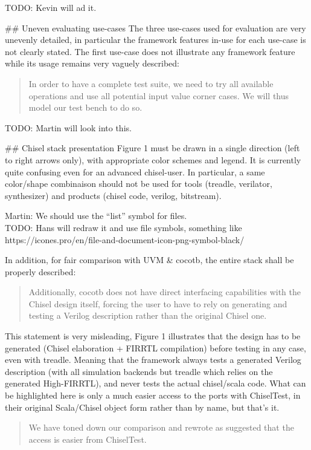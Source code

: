 \documentclass{article}
\newcommand{\todo}[1]{{\color{olive} TODO: #1}}
\newcommand{\martin}[1]{{\color{blue} Martin: #1\\}}
\newcommand{\reply}[1]{{\color{blue} #1}}
\begin{document}
\todo{Kevin will ad it.}

\#\# Uneven evaluating use-cases
The three use-cases used for evaluation are very unevenly detailed, in particular the framework features in-use for each use-case is not clearly stated.
The first use-case does not illustrate any framework feature while its usage remains very vaguely described:
\begin{quote}
In order to have a complete test suite,
we need to try all available operations and use all potential
input value corner cases. We will thus model our test bench
to do so.  
\end{quote}


\todo{Martin will look into this.}

\#\# Chisel stack presentation
Figure 1 must be drawn in a single direction (left to right arrows only), with appropriate color schemes and legend. It is currently quite confusing even for an advanced chisel-user.
In particular, a same color/shape combinaison should not be used for tools (treadle, verilator, synthesizer) and products (chisel code, verilog, bitstream).

\martin{We should use the ``list'' symbol for files.}
\todo{Hans will redraw it and use file symbols, something like https://icones.pro/en/file-and-document-icon-png-symbol-black/}


In addition, for fair comparison with UVM \& cocotb, the entire stack shall be properly described:

\begin{quote}
Additionally, cocotb does not have direct interfacing
capabilities with the Chisel design itself, forcing the user to
have to rely on generating and testing a Verilog description
rather than the original Chisel one.
\end{quote}

This statement is very misleading, Figure 1 illustrates that the design has to be generated (Chisel elaboration + FIRRTL compilation) before testing in any case, even with treadle.
Meaning that the framework always tests a generated Verilog description (with all simulation backends but treadle which relies on the generated High-FIRRTL), and never tests the actual chisel/scala code.
What can be highlighted here is only a much easier access to the ports with ChiselTest, in their original Scala/Chisel object form rather than by name, but that's it.

\begin{quote}
\reply{We have toned down our comparison and rewrote as suggested that the access is easier from ChiselTest.}
\end{quote}
\end{document}
